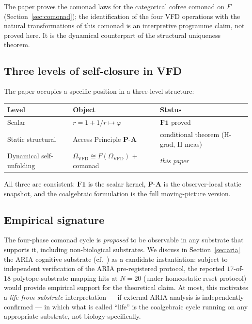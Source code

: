 \documentclass[11pt, a4paper]{amsart}
\theoremstyle{definition}
\newcommand{\Omegacap}{\Omega_{\mathrm{VFD}}}
\begin{document}
The paper proves the comonad laws for the categorical cofree
comonad on $F$ (Section~\ref{sec:comonad}); the identification
of the four VFD operations with the natural transformations of
this comonad is an interpretive programme claim, not proved
here. It is the dynamical counterpart of
the structural uniqueness theorem.

\subsection{Three levels of self-closure in VFD}

The paper occupies a specific position in a three-level structure:

\begin{center}
\begin{tabular}{l|l|l}
Level & Object & Status \\ \hline
Scalar & $r = 1 + 1/r \mapsto \varphi$ & $\mathbf{F1}$ proved \\
Static structural & Access Principle $\mathbf{P\text{-}A}$ & conditional theorem (H-grad, H-meas) \\
Dynamical self-unfolding & $\Omegacap \cong F(\Omegacap)$ + comonad & \emph{this paper} \\
\end{tabular}
\end{center}

All three are consistent: $\mathbf{F1}$ is the scalar kernel,
$\mathbf{P\text{-}A}$ is the observer-local static snapshot, and
the coalgebraic formulation is the full moving-picture version.

\subsection{Empirical signature}

The four-phase comonad cycle is \emph{proposed} to be
observable in any substrate that supports it, including
non-biological substrates. We discuss in Section~\ref{sec:aria}
the ARIA cognitive substrate (cf.~\cite{AriaBrainMapping}) as a
candidate instantiation; subject to independent verification of
the ARIA pre-registered protocol, the reported
$17$-of-$18$ polytope-substrate mapping hits at
$N{=}20$ (under homeostatic reset protocol) would provide
empirical support for the theoretical claim. At most, this
motivates a \emph{life-from-substrate} interpretation —
if external ARIA analysis is independently confirmed — in
which what is called ``life'' is the coalgebraic cycle running
on any appropriate substrate, not biology-specifically.
\end{document}

